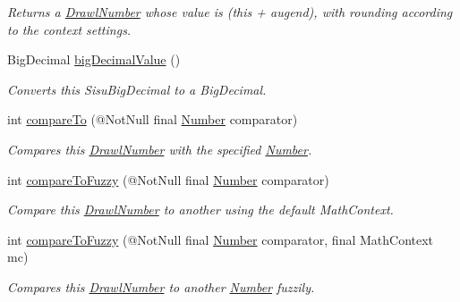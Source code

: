 \begin{DoxyCompactItemize}
\begin{DoxyCompactList}\small\item\em Returns a \hyperlink{classcom_1_1aarrelaakso_1_1drawl_1_1_drawl_number}{Drawl\+Number} whose value is (this + augend), with rounding according to the context settings. \end{DoxyCompactList}\item 
Big\+Decimal \hyperlink{classcom_1_1aarrelaakso_1_1drawl_1_1_drawl_number_acf97abc572acd173a4d8cd6c5b5c2ecd}{big\+Decimal\+Value} ()
\begin{DoxyCompactList}\small\item\em Converts this Sisu\+Big\+Decimal to a Big\+Decimal. \end{DoxyCompactList}\item 
int \hyperlink{classcom_1_1aarrelaakso_1_1drawl_1_1_drawl_number_a40d2c6535f85306aaf5b6e5886c51266}{compare\+To} (@Not\+Null final \hyperlink{interfacecom_1_1aarrelaakso_1_1drawl_1_1_number}{Number} comparator)
\begin{DoxyCompactList}\small\item\em Compares this \hyperlink{classcom_1_1aarrelaakso_1_1drawl_1_1_drawl_number}{Drawl\+Number} with the specified \hyperlink{interfacecom_1_1aarrelaakso_1_1drawl_1_1_number}{Number}. \end{DoxyCompactList}\item 
int \hyperlink{classcom_1_1aarrelaakso_1_1drawl_1_1_drawl_number_ab2624aa98592bb5dd20990c7f5921024}{compare\+To\+Fuzzy} (@Not\+Null final \hyperlink{interfacecom_1_1aarrelaakso_1_1drawl_1_1_number}{Number} comparator)
\begin{DoxyCompactList}\small\item\em Compare this \hyperlink{classcom_1_1aarrelaakso_1_1drawl_1_1_drawl_number}{Drawl\+Number} to another using the default Math\+Context. \end{DoxyCompactList}\item 
int \hyperlink{classcom_1_1aarrelaakso_1_1drawl_1_1_drawl_number_a67bb221c313ba22d920db646d130d66f}{compare\+To\+Fuzzy} (@Not\+Null final \hyperlink{interfacecom_1_1aarrelaakso_1_1drawl_1_1_number}{Number} comparator, final Math\+Context mc)
\begin{DoxyCompactList}\small\item\em Compares this \hyperlink{classcom_1_1aarrelaakso_1_1drawl_1_1_drawl_number}{Drawl\+Number} to another \hyperlink{interfacecom_1_1aarrelaakso_1_1drawl_1_1_number}{Number} fuzzily. \end{DoxyCompactList}\item 

\end{DoxyCompactItemize}
